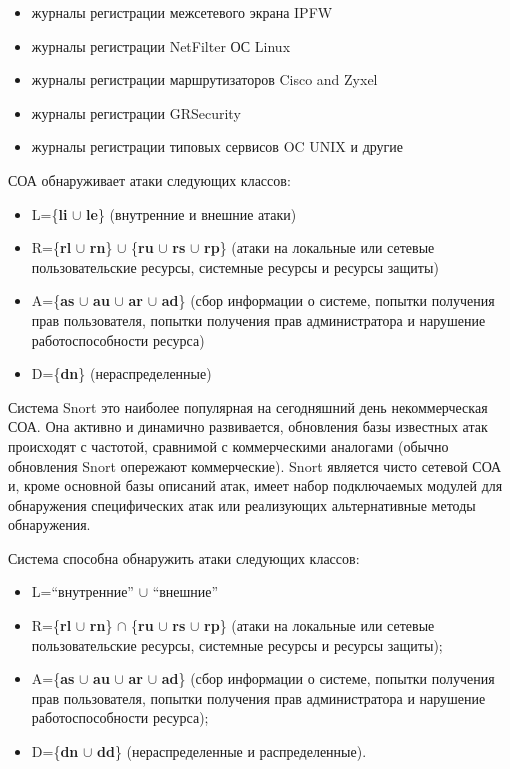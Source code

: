 \begin{itemize}

\item журналы регистрации межсетевого экрана IPFW
\item журналы регистрации NetFilter ОС Linux
\item журналы регистрации маршрутизаторов Cisco and Zyxel
\item журналы регистрации GRSecurity
\item журналы регистрации типовых сервисов OC UNIX и другие

\end{itemize}

СОА обнаруживает атаки следующих классов:

\begin{itemize}

\item L=\{\textbf{li} $\cup$ \textbf{le}\} (внутренние и внешние атаки)
\item R=\{\textbf{rl} $\cup$ \textbf{rn}\} $\cup$ \{\textbf{ru} $\cup$ \textbf{rs} $\cup$ \textbf{rp}\} (атаки на локальные или сетевые
пользовательские ресурсы, системные ресурсы и ресурсы защиты)
\item A=\{\textbf{as} $\cup$ \textbf{au} $\cup$ \textbf{ar} $\cup$ \textbf{ad}\} (сбор информации о системе, попытки получения
прав пользователя, попытки получения прав администратора и нарушение
работоспособности ресурса)
\item D=\{\textbf{dn}\} (нераспределенные)

\end{itemize}

Система Snort это наиболее популярная на сегодняшний день некоммерческая СОА.
Она активно и динамично развивается, обновления базы известных атак происходят с
частотой, сравнимой с коммерческими аналогами (обычно обновления Snort опережают
коммерческие). Snort является чисто сетевой СОА и, кроме основной базы описаний
атак, имеет набор подключаемых модулей для обнаружения специфических атак или
реализующих альтернативные методы обнаружения.

Система способна обнаружить атаки следующих классов:

\begin{itemize}

\item L=``внутренние'' $\cup$ ``внешние''
\item R=\{\textbf{rl} $\cup$ \textbf{rn}\} $\cap$ \{\textbf{ru} $\cup$ \textbf{rs} $\cup$ \textbf{rp}\} (атаки на локальные или сетевые
пользовательские ресурсы, системные ресурсы и ресурсы защиты);
\item A=\{\textbf{as} $\cup$ \textbf{au} $\cup$ \textbf{ar} $\cup$ \textbf{ad}\} (сбор информации о системе, попытки получения
прав пользователя, попытки получения прав администратора и нарушение
работоспособности ресурса);
\item D=\{\textbf{dn} $\cup$ \textbf{dd}\} (нераспределенные и распределенные).

\end{itemize}

